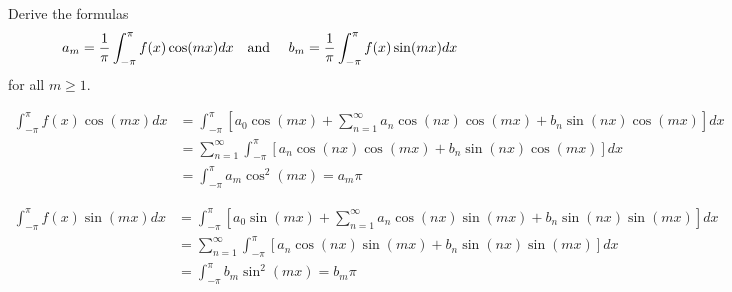 \begin{exercise}
\newcommand{\intpi}{\int_{-\pi}^\pi}
Derive the formulas
\[a_m = \frac{1}{\pi} \intpi f(x) \cos(mx) dx \text{\quad and \quad} b_m = \frac{1}{\pi}\intpi f(x) \sin(mx) dx\]
for all \(m \geq 1\).
\end{exercise}

\begin{solution}
\newcommand{\intpi}{\int_{-\pi}^\pi}
\[\begin{aligned}
\intpi f(x) \cos(mx) dx &= \intpi \left[a_0 \cos(mx) + \sum^\infty_{n=1} a_n \cos(nx) \cos(mx)+ b_n \sin(nx)\cos(mx)\right] dx \\
&=\sum^\infty_{n=1} \intpi \left[a_n \cos(nx) \cos(mx) + b_n \sin(nx) \cos(mx) \right]dx \\
&= \intpi a_m \cos^2(m x) = a_m \pi
\end{aligned}\]

\[\begin{aligned}
\intpi f(x) \sin(mx) dx &= \intpi \left[a_0 \sin(mx) + \sum^\infty_{n=1} a_n \cos(nx) \sin(mx)+ b_n \sin(nx)\sin(mx)\right] dx \\
&=\sum^\infty_{n=1} \intpi \left[a_n \cos(nx) \sin(mx) + b_n \sin(nx) \sin(mx) \right]dx \\
&= \intpi b_m \sin^2(m x) = b_m \pi
\end{aligned}\]
\end{solution}

